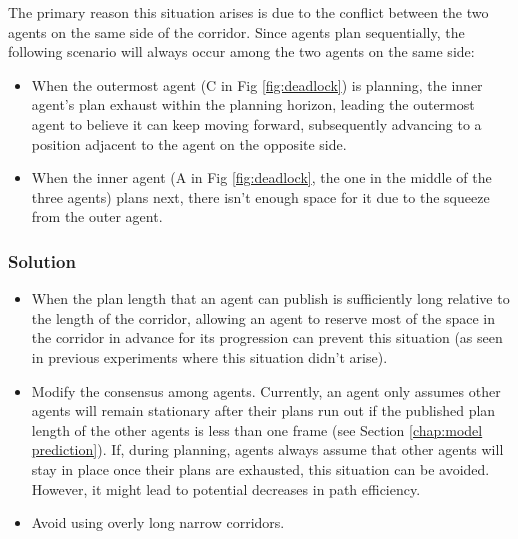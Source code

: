 The primary reason this situation arises is due to the conflict between the two agents on the same side of the corridor.
Since agents plan sequentially, the following scenario will always occur among the two agents on the same side:
\begin{itemize}
    \item 
    When the outermost agent (C in Fig \ref{fig:deadlock}) is planning, the inner agent's plan exhaust within the planning horizon, leading the outermost agent to believe it can keep moving forward, subsequently advancing to a position adjacent to the agent on the opposite side.
    \item 
    When the inner agent (A in Fig \ref{fig:deadlock}, the one in the middle of the three agents) plans next, there isn't enough space for it due to the squeeze from the outer agent.
\end{itemize}

\subsubsection{Solution}

\begin{itemize}
    \item
    When the plan length that an agent can publish is sufficiently long relative to the length of the corridor, allowing an agent to reserve most of the space in the corridor in advance for its progression can prevent this situation (as seen in previous experiments where this situation didn't arise).
    \item 
    Modify the consensus among agents. Currently, an agent only assumes other agents will remain stationary after their plans run out if the published plan length of the other agents is less than one frame (see Section \ref{chap:model prediction}). If, during planning, agents always assume that other agents will stay in place once their plans are exhausted, this situation can be avoided. However, it might lead to potential decreases in path efficiency.
    \item 
    Avoid using overly long narrow corridors.
\end{itemize}


